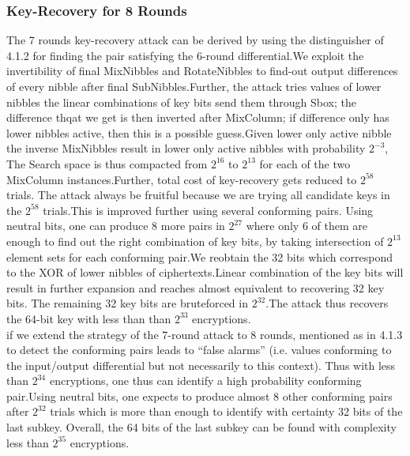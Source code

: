 \documentclass[preprint]{transcrypto}
\begin{document}
\subsubsection{Key-Recovery for 8 Rounds}
The 7 rounds key-recovery attack can be derived by using the distinguisher of 4.1.2 for
finding the pair satisfying the 6-round differential.We exploit the invertibility of final MixNibbles and RotateNibbles to find-out output differences of every nibble after final SubNibbles.Further, the attack tries values of lower nibbles the linear combinations of key bits send them through Sbox; the difference thqat we get is then inverted after MixColumn; if difference only has lower nibbles active, then this is a possible guess.Given lower only active nibble the inverse MixNibbles result in lower only active nibbles with probability $2^{−3}$, The Search space is thus compacted from $2^{16}$
to $2^{13}$ for each of the two MixColumn instances.Further, total cost of key-recovery gets reduced to $2^{58}$ trials. The attack always be fruitful because we are trying all candidate keys in the $2^{58}$ trials.This is improved further using several conforming pairs. Using neutral
bits, one can produce 8 more pairs in $2^27$ where only 6 of them are enough to
find out the right combination of key bits, by taking intersection of $2^{13}$ element sets for each conforming pair.We reobtain the 32 bits which correspond to the XOR of lower nibbles of ciphertexts.Linear combination of the key bits will result in further expansion and reaches almost equivalent to recovering 32 key bits. The remaining 32 key bits are bruteforced in $2^32$.The attack thus recovers the 64-bit key with less than than $2^{33}$ encryptions.\\

if we extend the strategy of the 7-round attack to 8 rounds, mentioned as in 4.1.3 to detect the conforming pairs leads to “false alarms” (i.e. values conforming to the input/output differential
but not necessarily to this context). Thus with less than $2^{34}$ encryptions, one thus can identify a high probability conforming pair.Using neutral bits, one expects to produce almost 8 other conforming pairs after $2^{32}$ trials which is more than enough to identify with certainty 32 bits
of the last subkey. Overall, the 64 bits of the last subkey can be found with complexity less than
$2^{35}$ encryptions.\\
\end{document}

